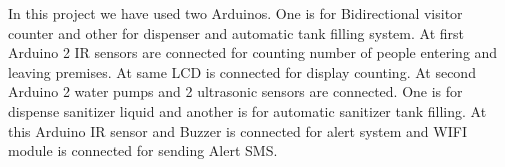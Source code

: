   \hspace{0.5cm} In this project we have used two Arduinos. One is for Bidirectional visitor counter and other for dispenser and automatic tank filling system. At first Arduino 2 IR sensors are connected for counting number of people entering and leaving premises. At same LCD is connected for display counting. At second Arduino 2 water pumps and 2 ultrasonic sensors are connected. One is for dispense sanitizer liquid and another is for automatic sanitizer tank filling. At this Arduino IR sensor and Buzzer is connected for alert system and WIFI module is connected for sending Alert SMS.

  
 